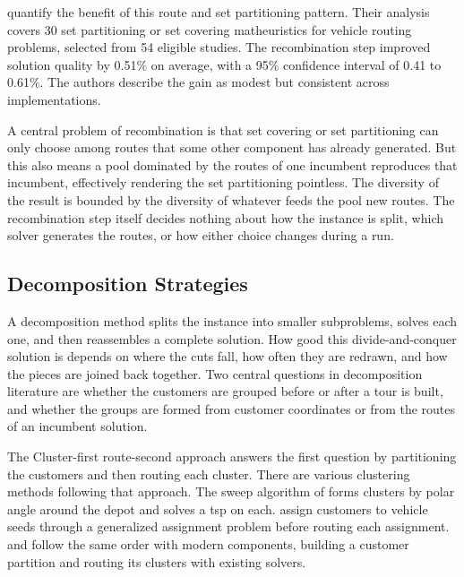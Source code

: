 \citet{arenasvasco2025meta} quantify the benefit of this route and set partitioning pattern. Their analysis covers 30 set partitioning or set covering matheuristics for vehicle routing problems, selected from 54 eligible studies. The recombination step improved solution quality by 0.51\% on average, with a 95\% confidence interval of 0.41 to 0.61\%. The authors describe the gain as modest but consistent across implementations.

A central problem of recombination is that set covering or set partitioning can only choose among routes that some other component has already generated. But this also means a pool dominated by the routes of one incumbent reproduces that incumbent, effectively rendering the set partitioning pointless. The diversity of the result is bounded by the diversity of whatever feeds the pool new routes. The recombination step itself decides nothing about how the instance is split, which solver generates the routes, or how either choice changes during a run.

\subsection{Decomposition Strategies}\label{sec:lit-decomposition}

A decomposition method splits the instance into smaller subproblems, solves each one, and then reassembles a complete solution. How good this divide-and-conquer solution is depends on where the cuts fall, how often they are redrawn, and how the pieces are joined back together. Two central questions in decomposition literature are whether the customers are grouped before or after a tour is built, and whether the groups are formed from customer coordinates or from the routes of an incumbent solution.

The Cluster-first route-second approach answers the first question by partitioning the customers and then routing each cluster. There are various clustering methods following that approach. The sweep algorithm of \citet{gillettHeuristicAlgorithmVehicleDispatch1974} forms clusters by polar angle around the depot and solves a \gls{tsp} on each. \citet{fisherGeneralizedAssignmentHeuristic1981} assign customers to vehicle seeds through a generalized assignment problem before routing each assignment. \citet{kerscherDecomposerouteimproveFrameworkSolving2025} and \citet{karaahmetogluAdaptiveClusterFirst2026} follow the same order with modern components, building a customer partition and routing its clusters with existing solvers.

